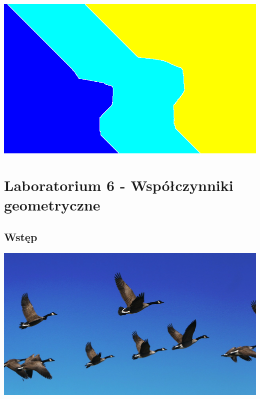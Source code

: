 \documentclass{article}
\begin{document}
	\begin{center}
		\includegraphics[width=\linewidth]{../../lab05/kaczki_chessboard.png}
	\end{center}
	
	\section{Laboratorium 6 - Współczynniki geometryczne} 
	\subsection{Wstęp}
	\begin{center}
		\includegraphics[width=\linewidth]{../../pictures/ptaki.jpg}
		\label{fig:ptaki}
	\end{center}
\end{document}
